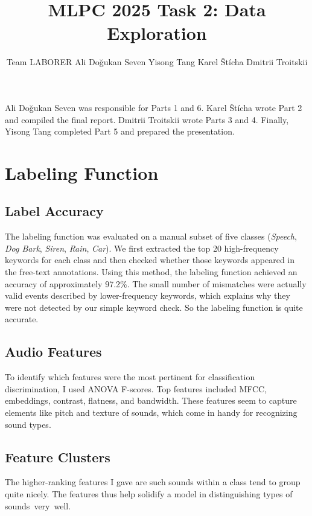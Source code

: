 \documentclass{article}
\title{MLPC 2025 Task 2: Data Exploration}
\author{%
  Team LABORER \AND
  Ali Doğukan Seven
  \And
  Yisong Tang
  \And 
  Karel Štícha
  \AND 
  Dmitrii Troitskii
}
\begin{document}
\maketitle


\begin{contributions}
  Ali Doğukan Seven was responsible for Parts 1 and 6. Karel Štícha wrote Part 2 and compiled the final report. Dmitrii Troitskii wrote Parts 3 and 4. Finally, Yisong Tang completed Part 5 and prepared the presentation.
\end{contributions}
\section{Labeling Function}
\subsection{Label Accuracy}
The labeling function was evaluated on a manual subset of five classes (\textit{Speech}, \textit{Dog Bark}, \textit{Siren}, \textit{Rain}, \textit{Car}). We first extracted the top 20 high-frequency keywords for each class and then checked whether those keywords appeared in the free-text annotations. Using this method, the labeling function achieved an accuracy of approximately 97.2\%. The small number of mismatches were actually valid events described by lower-frequency keywords, which explains why they were not detected by our simple keyword check. So the labeling function is quite accurate.

\subsection{Audio Features}
To identify which features were the most pertinent for classification discrimination, I used ANOVA F-scores. Top features included MFCC, embeddings, contrast, flatness, and bandwidth. These features seem to capture elements like pitch and texture of sounds, which come in handy for recognizing sound types. 

\subsection{Feature Clusters}
The higher-ranking features I gave are such sounds within a class tend to group quite nicely. The features thus help solidify a model in distinguishing types of sounds very well.
\end{document}
